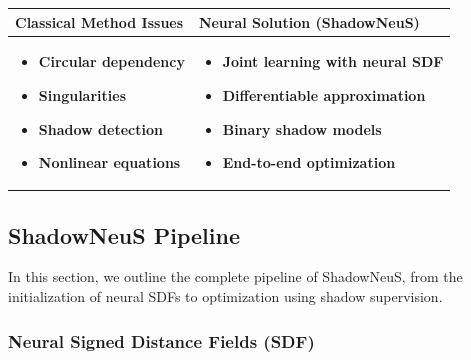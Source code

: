 \documentclass[12pt,a4paper]{article}
\theoremstyle{definition}
\begin{document}
\begin{tabular}{p{} p{}}
\hline
\textbf{Classical Method Issues} & \textbf{Neural Solution (ShadowNeuS)} \\
\hline
\begin{itemize}[noitemsep, topsep=0pt]
    \item \textbf{Circular dependency}
    \item \textbf{Singularities}
    \item \textbf{Shadow detection}
    \item \textbf{Nonlinear equations}
\end{itemize} &
\begin{itemize}[noitemsep, topsep=0pt]
    \item \textbf{Joint learning with neural SDF}
    \item \textbf{Differentiable approximation}
    \item \textbf{Binary shadow models}
    \item \textbf{End-to-end optimization}
\end{itemize} \\
\hline
\end{tabular}

\newpage

\subsection{ShadowNeuS Pipeline} \label{sec:classical_to_neural}

In this section, we outline the complete pipeline of ShadowNeuS, from the initialization of neural SDFs to optimization using shadow supervision.

\subsubsection{Neural Signed Distance Fields (SDF)} \label{sec:neural_sdf}
\end{document}
